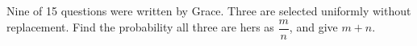 Nine of 15 questions were written by Grace. Three are selected uniformly without replacement. Find the probability all three are hers as $\dfrac{m}{n}$, and give $m+n$.
